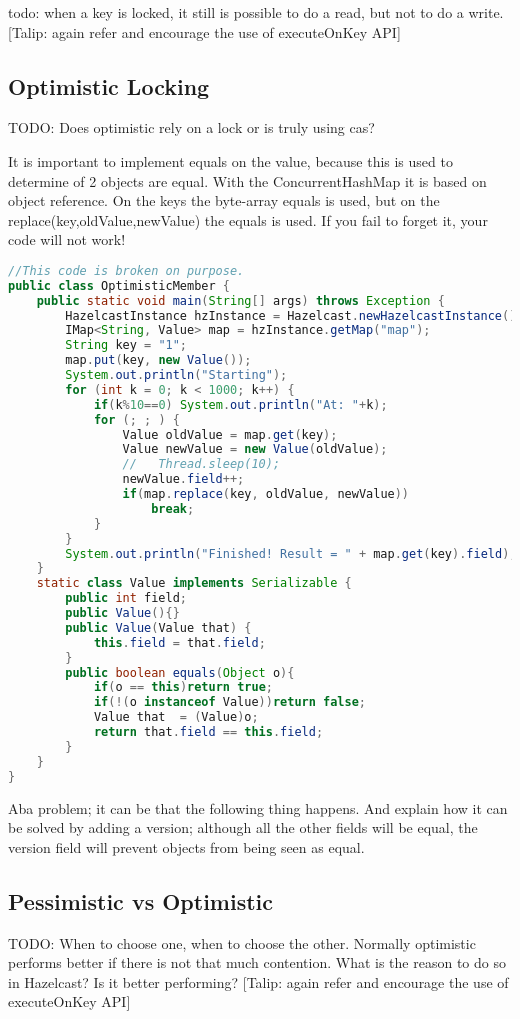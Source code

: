 todo: when a key is locked, it still is possible to do a read, but not to do a write.
[Talip: again refer and encourage the use of executeOnKey API]

\subsection{Optimistic Locking}
TODO: Does optimistic rely on a lock or is truly using cas?

It is important to implement equals on the value, because this is used to determine of 2 objects are equal. With the ConcurrentHashMap it is based on object reference. On the keys the byte-array equals is used, but on the replace(key,oldValue,newValue) the equals is used. If you fail to forget it, your code will not work!

\begin{lstlisting}[language=java]
//This code is broken on purpose.
public class OptimisticMember {
    public static void main(String[] args) throws Exception {
        HazelcastInstance hzInstance = Hazelcast.newHazelcastInstance();
        IMap<String, Value> map = hzInstance.getMap("map");
        String key = "1";
        map.put(key, new Value());
        System.out.println("Starting");
        for (int k = 0; k < 1000; k++) {
            if(k%10==0) System.out.println("At: "+k);
            for (; ; ) {
                Value oldValue = map.get(key);
                Value newValue = new Value(oldValue);
                //   Thread.sleep(10);
                newValue.field++;
                if(map.replace(key, oldValue, newValue))
                    break;
            }
        }
        System.out.println("Finished! Result = " + map.get(key).field);
    }
    static class Value implements Serializable {
        public int field;
        public Value(){}
        public Value(Value that) {
            this.field = that.field;
        }
        public boolean equals(Object o){
            if(o == this)return true;
            if(!(o instanceof Value))return false;
            Value that  = (Value)o;
            return that.field == this.field;
        }
    }
}
\end{lstlisting}
Aba problem; it can be that the following thing happens. And explain how it can be solved by adding a version; although all the other fields will be equal, the version field will prevent objects from being seen as equal.

\subsection{Pessimistic vs Optimistic}
TODO: When to choose one, when to choose the other. Normally optimistic performs better if there is not that much contention. What is the reason to do so in Hazelcast? Is it better performing?
[Talip: again refer and encourage the use of executeOnKey API]


